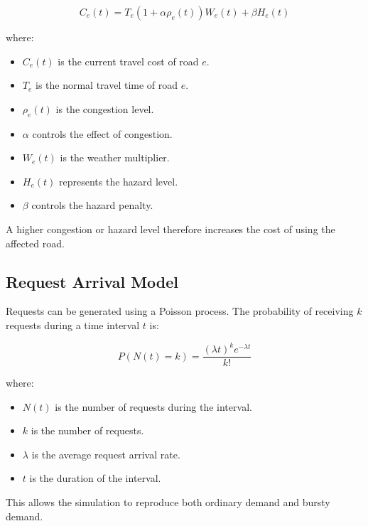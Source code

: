 \documentclass[12pt,a4paper]{article}
\begin{document}
\begin{equation}
    C_e(t)
    =
    T_e
    \left(1+\alpha\rho_e(t)\right)
    W_e(t)
    +
    \beta H_e(t)
    \label{eq:roadcost}
\end{equation}

where:

\begin{itemize}
    \item $C_e(t)$ is the current travel cost of road $e$.
    \item $T_e$ is the normal travel time of road $e$.
    \item $\rho_e(t)$ is the congestion level.
    \item $\alpha$ controls the effect of congestion.
    \item $W_e(t)$ is the weather multiplier.
    \item $H_e(t)$ represents the hazard level.
    \item $\beta$ controls the hazard penalty.
\end{itemize}

A higher congestion or hazard level therefore increases the cost of
using the affected road.





\subsection{Request Arrival Model}

Requests can be generated using a Poisson process. The probability
of receiving $k$ requests during a time interval $t$ is:

\begin{equation}
    P(N(t)=k)
    =
    \frac{(\lambda t)^k e^{-\lambda t}}{k!}
    \label{eq:poisson}
\end{equation}

where:

\begin{itemize}
    \item $N(t)$ is the number of requests during the interval.
    \item $k$ is the number of requests.
    \item $\lambda$ is the average request arrival rate.
    \item $t$ is the duration of the interval.
\end{itemize}

This allows the simulation to reproduce both ordinary demand and
bursty demand.
\end{document}
